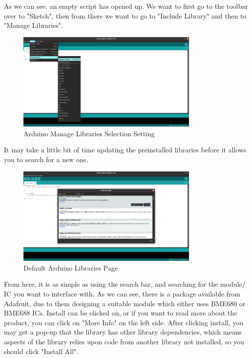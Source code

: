 \documentclass[a4paper,11pt]{report}
\begin{document}
As we can see, an empty script has opened up. We want to first go to the toolbar over to "Sketch", then from there we want to go to "Include Library" and then to "Manage Libraries".

\begin{figure}[H]
\centering
\includegraphics[width=0.8\textwidth]{screenshots/arduinomanagelibrariesselect}
\caption{Arduino Manage Libraries Selection Setting}
\end{figure}

It may take a little bit of time updating the preinstalled libraries before it allows you to search for a new one.

\begin{figure}[H]
\centering
\includegraphics[width=0.8\textwidth]{screenshots/arduinolibrariespage}
\caption{Default Arduino Libraries Page}
\end{figure}

From here, it is as simple as using the search bar, and searching for the module/ IC you want to interface with. As we can see, there is a package available from Adafruit, due to them designing a suitable module which either uses BME680 or BME688 ICs. Install can be clicked on, or if you want to read more about the product, you can click on "More Info" on the left side. After clicking install, you may get a pop-up that the library has other library dependencies, which means aspects of the library relies upon code from another library not installed, so you should click "Install All".
\end{document}
